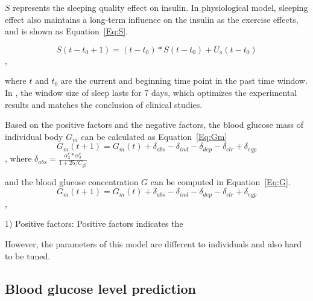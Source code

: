 $S$ represents the sleeping quality effect on insulin. In physiological model, sleeping
effect also maintains a long-term influence on the insulin as the exercise effects,
and is shown as Equation~\ref{Eq:S}.

\begin{equation}\label{Eq:S}
S(t-t_0+1)=(t-t_0)*S(t-t_0)+U_{s}(t-t_0)
\end{equation},

where $t$ and $t_0$ are the current and beginning time point in the past time window. In \sysname,
the window size of sleep lasts for 7 days, which optimizes the experimental results and matches the conclusion
of clinical studies.

Based on the positive factors and the negative factors, the blood glucose mass of individual body
$G_m$ can be calculated as Equation~\ref{Eq:Gm}
\begin{equation}\label{Eq:Gm}
G_m(t+1)=G_m(t)+\delta_{abs}-\delta_{ind}-\delta_{dep}-\delta_{clr}+\delta_{egp}
\end{equation},
where $\delta_{abs}=\frac{\alpha_3^c*\alpha_2^c}{1+25/C_{g2}}$

and the blood glucose concentration $G$ can be computed in Equation~\ref{Eq:G}.
\begin{equation}\label{Eq:G}
G_m(t+1)=G_m(t)+\delta_{abs}-\delta_{ind}-\delta_{dep}-\delta_{clr}+\delta_{egp}
\end{equation},


1) Positive factors:
Positive factors indicates the

However, the parameters of this model are different to individuals and also hard to be tuned.

\subsection{Blood glucose level prediction}



